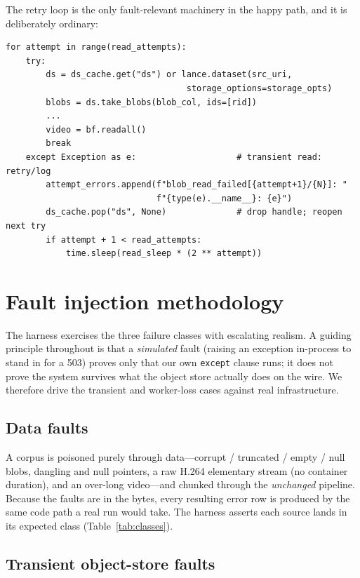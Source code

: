 \documentclass[11pt]{article}
\newcommand{\ct}[1]{\texttt{\small #1}}
\begin{document}
The retry loop is the only fault-relevant machinery in the happy path, and it is
deliberately ordinary:

\begin{lstlisting}[style=py]
for attempt in range(read_attempts):
    try:
        ds = ds_cache.get("ds") or lance.dataset(src_uri,
                                    storage_options=storage_opts)
        blobs = ds.take_blobs(blob_col, ids=[rid])
        ...
        video = bf.readall()
        break
    except Exception as e:                    # transient read: retry/log
        attempt_errors.append(f"blob_read_failed[{attempt+1}/{N}]: "
                              f"{type(e).__name__}: {e}")
        ds_cache.pop("ds", None)              # drop handle; reopen next try
        if attempt + 1 < read_attempts:
            time.sleep(read_sleep * (2 ** attempt))
\end{lstlisting}

\section{Fault injection methodology}
\label{sec:methodology}

The harness exercises the three failure classes with escalating realism. A guiding
principle throughout is that a \emph{simulated} fault (raising an exception
in-process to stand in for a 503) proves only that our own \ct{except} clause
runs; it does not prove the system survives what the object store actually does
on the wire. We therefore drive the transient and worker-loss cases against real
infrastructure.

\subsection{Data faults}

A corpus is poisoned purely through data---corrupt / truncated / empty / null
blobs, dangling and null pointers, a raw H.264 elementary stream (no container
duration), and an over-long video---and chunked through the \emph{unchanged}
pipeline. Because the faults are in the bytes, every resulting error row is
produced by the same code path a real run would take. The harness asserts each
source lands in its expected class (Table~\ref{tab:classes}).

\subsection{Transient object-store faults}
\label{sec:transient}
\end{document}
